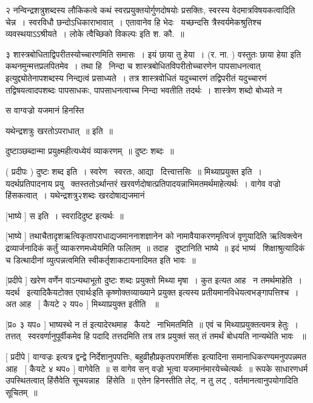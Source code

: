 \documentclass[11pt, openany]{book}
\begin{document}
२ {\qt नन्विन्द्रशत्रुशब्दस्य} लौकिकत्वे कथं स्वरप्रयुक्तयोर्गुणदोषयोः
प्रसक्तिः, स्वरस्य वेदमात्रविषयकत्वादिति चेन्न~। स्वरविधौ
छन्दोऽधिकाराभावात्~। एतावानेव हि भेदः \textendash\ यच्छन्दसि
त्रैस्वर्यमेकश्रुतिश्च व्यवस्थयाऽऽश्रीयते~। लोके {\qt त्वैच्छिको विकल्पः}
इति श. कौ.~॥ 

३ शास्त्रबोधिताद्विपरीतस्योच्चारणमिति समासः~। इयं छाया तु हेया~। (र.
ना. ) वस्तुतः {\qt छाया हेया} इति कथनमुन्मत्तप्रलपितमेव~। तथा हि \textendash\ {\qt निन्दा च
शास्त्रबोधितविपरीतोच्चारणेन पापसाधनत्वात्} इत्युद्द्योतेनापशब्दस्य
निन्द्यत्वं प्रसाध्यते~। तत्र शास्त्रवोधितं यदुच्चारणं तद्विपरीतं
यदुच्चारणं तद्विषयत्वादपशब्दः पापसाधकः, पापसाधनत्वाच्च निन्दा भवतीति
तदर्थः~। शास्त्रेण शब्दो बोध्यते न 





 स वाग्वज्रो यजमानं हिनस्ति 

 यथेन्द्रशत्रुः खरतोऽपराधात्~॥ इति~॥ 

 दुष्टाञ्छब्दान्मा प्रयुक्ष्महीत्यध्येयं व्याकरणम्~॥ दुष्टः शब्दः~॥ 

 ( प्रदीपः ) दुष्टः शब्द इति~। स्वरेण \textendash\ स्वरतः, आद्या \textendash\ 
दित्त्वात्तसिः~॥ मिथ्याप्रयुक्त इति~। यदर्थप्रतिपादनाय प्रयु \textendash\ 
क्तस्ततोऽर्थान्तरं खरवर्णदोषात्प्रतिपादयन्नाभिमतमर्थमाहेत्यर्थः~। वागेव
वज्रो हिंसकत्वात्~। यथेन्द्रशत्रु२शब्दः खरदोषाद्यजमानं 



 [भाष्ये ] स इति~। स्वरादिदुष्ट इत्यर्थः~॥ 

 [भाष्ये ] तथाचैतादृशऋत्विकृतापराधाद्यजमाननाशज्ञानेन को
नामावैयाकरणमृत्विजं वृणुयादिति ऋत्विक्त्वेन द्रव्यार्जनादिकं कर्तुं
व्याकरणमध्येयमिति फलितम्~॥ तदाह \textendash\ दुष्टानिति भाष्ये~॥ इदं
भाष्यं \textendash\ शिक्षाश्रुत्यादिकं च डित्थादीनां व्युत्पन्नत्वमिति
स्वीकर्तृशाकटायनादिमत इति भावः~॥ 

 [प्रदीपे ] {\qt खरेण वर्णेन} वाऽन्यथाभूतो दुष्टः शब्दः प्रयुक्तो मिथ्या
मृषा~। कुत इत्यत आह \textendash\ न तमर्थमाहेति~। यदर्थ \textendash\ इत्यादिकैयटोक्त एवार्थःइति
कृष्णोक्तव्याख्याने प्रयुक्त इत्यस्य प्रतीयमानविधेयत्वभङ्गापत्तिश्च~। अत
आह \textendash\ [ कैयटे २ यप० ] मिथ्याप्रयुक्त इतीति ~॥ 

 [प्र० ३ यप० ] भाष्यस्थे {\qt न तं इत्यादेरथमाह} \textendash\ कैयटे \textendash\ नाभिमतमिति~॥
एवं च मिथ्याप्रयुक्तत्वमत्र हेतुः~। तत्तत् \textendash\ स्वरवर्णानुपूर्वीकमेव हि
पदादि तत्तदमिति तत्र तत्र प्रयुक्तं सत् तं तमर्थं बोधयति नान्यथेति भावः
~॥ 

 [ प्रदीपे ] वाग्वज्रः इत्यत्र द्वन्द्वे निर्देशानुपपत्तिः,
बहुव्रीहौप्रकृतपरामर्शिसः इत्यादिना समानाधिकरण्यमनुपपन्नमत आह \textendash\ [
कैयटे ४ थप० ] वागेवेति~॥ स वागेव सन् वज्रो भूत्वा
यजमानंमारयेच्चेत्यर्थः~॥ रूपके साधारणधर्म उपस्थितत्वात् हिंसैवेति
सूचयन्नाह \textendash\ हिंसेति~॥ एतेन हिनस्तीति लेट्, न तु लट् ,
वर्तमानत्वानुपयोगादिति सूचितम्~॥ 
\end{document}
